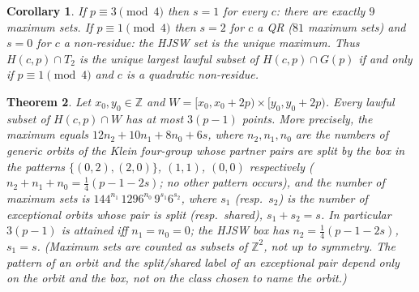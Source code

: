 \documentclass[11pt]{article}
\newtheorem{theorem}{Theorem}
\newtheorem{corollary}[theorem]{Corollary}
\theoremstyle{remark}
\newcommand{\Z}{\mathbb{Z}}
\newcommand{\Hc}{H(c,p)}
\newcommand{\Gp}{G(p)}
\begin{document}
\begin{corollary}\label{cor:qr}
If $p\equiv3\pmod4$ then $s=1$ for every $c$: there are exactly $9$ maximum sets.  If $p\equiv1\pmod4$ then $s=2$ for
$c$ a QR ($81$ maximum sets) and $s=0$ for $c$ a non-residue: the HJSW set is the unique maximum.  Thus $\Hc\cap T_2$
is the unique largest lawful subset of $\Hc\cap\Gp$ if and only if $p\equiv1\pmod4$ and $c$ is a quadratic non-residue.
\end{corollary}

\begin{theorem}\label{thm:window}
Let $x_0,y_0\in\Z$ and $W=[x_0,x_0+2p)\times[y_0,y_0+2p)$.  Every lawful subset of $\Hc\cap W$ has at most $3(p-1)$
points.  More precisely, the maximum equals $12n_2+10n_1+8n_0+6s$, where $n_2,n_1,n_0$ are the numbers of generic
orbits of the Klein four-group whose partner pairs are split by the box in the patterns $\{(0,2),(2,0)\}$, $(1,1)$, $(0,0)$
respectively ($n_2+n_1+n_0=\tfrac14(p-1-2s)$; no other pattern occurs), and the number of maximum sets is
$144^{n_1}\,1296^{n_0}\,9^{s_1}6^{s_2}$, where $s_1$ (resp.\ $s_2$) is the number of exceptional orbits whose pair is split
(resp.\ shared), $s_1+s_2=s$.  In particular $3(p-1)$ is attained iff $n_1=n_0=0$; the HJSW box has $n_2=\tfrac14(p-1-2s)$,
$s_1=s$.  (Maximum sets are counted as subsets of $\Z^2$, not up to symmetry.  The pattern of an orbit and the split/shared
label of an exceptional pair depend only on the orbit and the box, not on the class chosen to name the orbit.)
\end{theorem}
\end{document}
